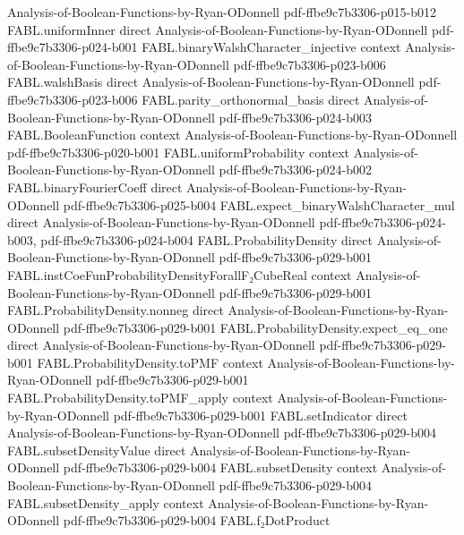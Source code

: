 \begin{theorem}
  {Analysis-of-Boolean-Functions-by-Ryan-ODonnell}
  {pdf-ffbe9c7b3306-p015-b012}
\proofstep
  {FABL.uniformInner}
  {direct}
  {Analysis-of-Boolean-Functions-by-Ryan-ODonnell}
  {pdf-ffbe9c7b3306-p024-b001}
\proofstep
  {FABL.binaryWalshCharacter_injective}
  {context}
  {Analysis-of-Boolean-Functions-by-Ryan-ODonnell}
  {pdf-ffbe9c7b3306-p023-b006}
\proofstep
  {FABL.walshBasis}
  {direct}
  {Analysis-of-Boolean-Functions-by-Ryan-ODonnell}
  {pdf-ffbe9c7b3306-p023-b006}
\proofstep
  {FABL.parity_orthonormal_basis}
  {direct}
  {Analysis-of-Boolean-Functions-by-Ryan-ODonnell}
  {pdf-ffbe9c7b3306-p024-b003}
\proofstep
  {FABL.BooleanFunction}
  {context}
  {Analysis-of-Boolean-Functions-by-Ryan-ODonnell}
  {pdf-ffbe9c7b3306-p020-b001}
\proofstep
  {FABL.uniformProbability}
  {context}
  {Analysis-of-Boolean-Functions-by-Ryan-ODonnell}
  {pdf-ffbe9c7b3306-p024-b002}
\proofstep
  {FABL.binaryFourierCoeff}
  {direct}
  {Analysis-of-Boolean-Functions-by-Ryan-ODonnell}
  {pdf-ffbe9c7b3306-p025-b004}
\proofstep
  {FABL.expect_binaryWalshCharacter_mul}
  {direct}
  {Analysis-of-Boolean-Functions-by-Ryan-ODonnell}
  {pdf-ffbe9c7b3306-p024-b003,
    pdf-ffbe9c7b3306-p024-b004}
\proofstep
  {FABL.ProbabilityDensity}
  {direct}
  {Analysis-of-Boolean-Functions-by-Ryan-ODonnell}
  {pdf-ffbe9c7b3306-p029-b001}
\proofstep
  {FABL.instCoeFunProbabilityDensityForallF₂CubeReal}
  {context}
  {Analysis-of-Boolean-Functions-by-Ryan-ODonnell}
  {pdf-ffbe9c7b3306-p029-b001}
\proofstep
  {FABL.ProbabilityDensity.nonneg}
  {direct}
  {Analysis-of-Boolean-Functions-by-Ryan-ODonnell}
  {pdf-ffbe9c7b3306-p029-b001}
\proofstep
  {FABL.ProbabilityDensity.expect_eq_one}
  {direct}
  {Analysis-of-Boolean-Functions-by-Ryan-ODonnell}
  {pdf-ffbe9c7b3306-p029-b001}
\proofstep
  {FABL.ProbabilityDensity.toPMF}
  {context}
  {Analysis-of-Boolean-Functions-by-Ryan-ODonnell}
  {pdf-ffbe9c7b3306-p029-b001}
\proofstep
  {FABL.ProbabilityDensity.toPMF_apply}
  {context}
  {Analysis-of-Boolean-Functions-by-Ryan-ODonnell}
  {pdf-ffbe9c7b3306-p029-b001}
\proofstep
  {FABL.setIndicator}
  {direct}
  {Analysis-of-Boolean-Functions-by-Ryan-ODonnell}
  {pdf-ffbe9c7b3306-p029-b004}
\proofstep
  {FABL.subsetDensityValue}
  {direct}
  {Analysis-of-Boolean-Functions-by-Ryan-ODonnell}
  {pdf-ffbe9c7b3306-p029-b004}
\proofstep
  {FABL.subsetDensity}
  {context}
  {Analysis-of-Boolean-Functions-by-Ryan-ODonnell}
  {pdf-ffbe9c7b3306-p029-b004}
\proofstep
  {FABL.subsetDensity_apply}
  {context}
  {Analysis-of-Boolean-Functions-by-Ryan-ODonnell}
  {pdf-ffbe9c7b3306-p029-b004}
\proofstep
  {FABL.f₂DotProduct}

\end{theorem}
